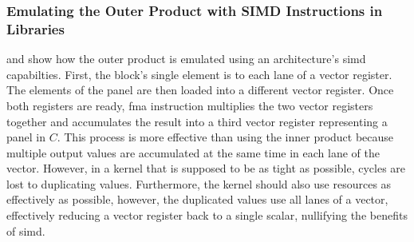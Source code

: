 \documentclass[\main/thesis.tex]{subfiles}
\begin{document}
\subsubsection{Emulating the Outer Product with SIMD Instructions in Libraries}
\label{sec:emulateProduct}
 and  show how the outer product is emulated using an architecture's \gls{simd} capabilties.
First, the block's single element is  to each \gls{lane} of a vector register.
The elements of the panel are then loaded into a different vector register.
Once both registers are ready,  \gls{fma} instruction multiplies the two vector registers together and accumulates the result into a third vector register representing a panel in $C$.
This process is more effective than using the inner product because multiple output values are accumulated at the same time in each \gls{lane} of the vector.
However, in a kernel that is supposed to be as tight as possible, cycles are lost to duplicating values.
Furthermore, the kernel should also use resources as effectively as possible, however, the duplicated values use all \glspl{lane} of a vector, effectively reducing a vector register back to a single scalar, nullifying the benefits of \gls{simd}.
\end{document}
